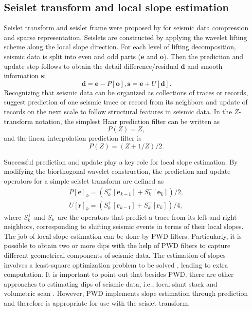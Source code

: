 \subsection{Seislet transform and local slope estimation}

Seislet transform and seislet frame were proposed by \cite{fomel2010seislet} for seismic data compression and sparse representation. Seislets are constructed by applying the wavelet lifting scheme \citep{sweldens1998lifting} along the local slope direction. For each level of lifting decomposition, seismic data is split into even and odd parts ($\mathbf{e}$ and $\mathbf{o}$). Then the prediction and update step follows to obtain the detail difference/residual $\mathbf{d}$ and smooth information $\mathbf{s}$:
\begin{equation}
\mathbf{d}=\mathbf{e}-P[\mathbf{o}],\mathbf{s}=\mathbf{e}+U[\mathbf{d}].
\end{equation}
Recognizing that seismic data can be organized as collections of traces or records, \cite{fomel2010seislet} suggest prediction of one seismic trace or record from its neighbors and update of records on the next scale to follow structural features in seismic data. In the $Z$-transform notation, the simplest Haar prediction filter can be written as
\begin{equation}
 P(Z)=Z,
\end{equation}
and the linear interpolation prediction filter is
\begin{equation}
 P(Z)=(Z+1/Z)/2.
\end{equation}


Successful prediction and update play a key role for local slope estimation. By modifying the biorthogonal wavelet construction, the prediction and update operators for a simple seislet transform are defined as
\begin{equation}
\begin{split}
 P[\mathbf{e}]_k=(S_k^{+}[\mathbf{e}_{k-1}] + S_{k}^{-} [\mathbf{e}_k]) /2,\\
 U[\mathbf{r}]_k=(S_k^{+}[\mathbf{r}_{k-1}] + S_{k}^{-} [\mathbf{r}_k]) /4,
\end{split}
\end{equation}
where $S_k^{+}$ and $S_k^{-}$ are the operators that predict a trace from its left and right neighbors, corresponding to shifting seismic events in terms of their local slopes. The job of local slope estimation can be done by PWD filters. Particularly, it is possible to obtain two or more dips with the help of PWD filters to capture different geometrical components of seismic data. The estimation of slopes involves a least-square optimization problem to be solved \citep{fomel2002applications}, leading to extra computation. It is important to point out that besides PWD, there are other approaches to estimating dips of seismic data, i.e., local slant stack \citep{ottolini1983signal} and volumetric scan \citep{marfurt2006robust}. However, PWD implements slope estimation through prediction and therefore is appropriate for use with the seislet transform. 


